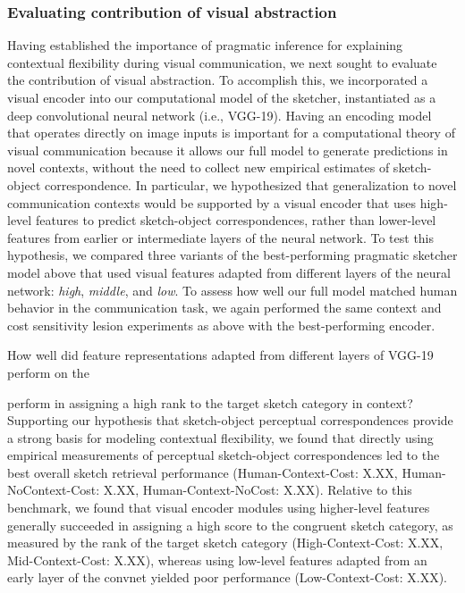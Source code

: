 \documentclass[9pt,twocolumn,twoside]{pnas-new}
\begin{document}
\subsubsection*{Evaluating contribution of visual abstraction}

Having established the importance of pragmatic inference for explaining contextual flexibility during visual communication, we next sought to evaluate the contribution of visual abstraction. 
To accomplish this, we incorporated a visual encoder into our computational model of the sketcher, instantiated as a deep convolutional neural network (i.e., VGG-19). 
Having an encoding model that operates directly on image inputs is important for a computational theory of visual communication because it allows our full model to generate predictions in novel contexts, without the need to collect new empirical estimates of sketch-object correspondence. 
In particular, we hypothesized that generalization to novel communication contexts would be supported by a visual encoder that uses high-level features to predict sketch-object correspondences, rather than lower-level features from earlier or intermediate layers of the neural network. 
To test this hypothesis, we compared three variants of the best-performing pragmatic sketcher model above that used visual features adapted from different layers of the neural network: \textit{high}, \textit{middle}, and \textit{low}. 
To assess how well our full model matched human behavior in the communication task, we again performed the same context and cost sensitivity lesion experiments as above with the best-performing encoder.



How well did feature representations adapted from different layers of VGG-19 perform on the 

perform in assigning a high rank to the target sketch category in context? Supporting our hypothesis that sketch-object perceptual correspondences provide a strong basis for modeling contextual flexibility, we found that directly using empirical measurements of perceptual sketch-object correspondences led to the best overall sketch retrieval performance (Human-Context-Cost: X.XX, Human-NoContext-Cost: X.XX, Human-Context-NoCost: X.XX). Relative to this benchmark, we found that visual encoder modules using higher-level features generally succeeded in assigning a high score to the congruent sketch category, as measured by the rank of the target sketch category (High-Context-Cost: X.XX, Mid-Context-Cost: X.XX), whereas using low-level features adapted from an early layer of the convnet yielded poor performance (Low-Context-Cost: X.XX).
\end{document}
